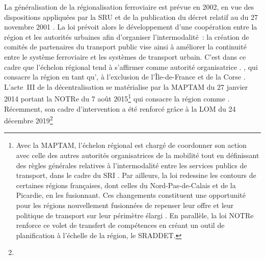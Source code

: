 \begin{refsegment}
{    La généralisation de la régionalisation ferroviaire est prévue en 2002, en vue des dispositions appliquées par la \acrfull{SRU} et de la publication du décret relatif au  du 27 novembre 2001 \textcolor{blue}{\autocite[132]{burlando_regionalisation_2004}}. La loi prévoit alors le développement d'une coopération entre la région et les autorités urbaines afin d'organiser l'intermodalité~: la création de comités de partenaires du transport public vise ainsi à améliorer la continuité entre le système ferroviaire et les systèmes de transport urbain. C'est dans ce cadre que l'échelon régional tend à s'affirmer comme autorité organisatrice  \textcolor{blue}{\autocite[I-18]{chauvineau_regionalisation_2001}}.
}, qui consacre la région en tant qu', à l'exclusion de l'Île-de-France et de la Corse \textcolor{blue}{\autocite{commission_nationale_du_debat_public_chronologie_nodate}}. L'acte~III de la décentralisation se matérialise par la \acrfull{MAPTAM} du 27 janvier 2014 portant la \acrfull{NOTRe} du 7 août 2015\footnote{
    Avec la \acrfull{MAPTAM}, l'échelon régional est chargé de coordonner son action avec celle des autres autorités organisatrices de la mobilité tout en définissant des règles générales relatives à l'intermodalité entre les services publics de transport, dans le cadre du \acrfull{SRI} \textcolor{blue}{\autocite{gart_aom_nodate}}. Par ailleurs, la loi redessine les contours de certaines régions françaises, dont celles du Nord-Pas-de-Calais et de la Picardie, en les fusionnant. Ces changements constituent une opportunité pour les régions nouvellement fusionnées de repenser leur offre et leur politique de transport sur leur périmètre élargi \textcolor{blue}{\autocite{cerema_mobilite_2017}}. En parallèle, la loi \acrfull{NOTRe} renforce ce volet de transfert de compétences en créant un outil de planification à l'échelle de la région, le \acrfull{SRADDET}.
} qui consacre la région comme  \textcolor{blue}{\autocite{gart_aom_nodate}}. Récemment, son cadre d'intervention a été renforcé grâce à la \acrfull{LOM} du 24 décembre 2019\footnote{
}
\end{refsegment}
